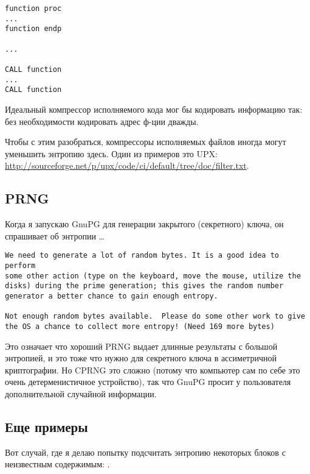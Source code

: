\begin{lstlisting}[style=customasmx86]
function proc
...
function endp

...

CALL function
...
CALL function
\end{lstlisting}

Идеальный компрессор исполняемого кода мог бы кодировать информацию так:
 без необходимости кодировать
адрес ф-ции  дважды.

Чтобы с этим разобраться, компрессоры исполняемых файлов иногда могут уменьшить энтропию здесь.
Один из примеров это UPX: \url{http://sourceforge.net/p/upx/code/ci/default/tree/doc/filter.txt}.

\subsection{\ac{PRNG}}

Когда я запускаю GnuPG для генерации закрытого (секретного) ключа, он спрашивает об энтропии \dots

\begin{lstlisting}
We need to generate a lot of random bytes. It is a good idea to perform
some other action (type on the keyboard, move the mouse, utilize the
disks) during the prime generation; this gives the random number
generator a better chance to gain enough entropy.

Not enough random bytes available.  Please do some other work to give
the OS a chance to collect more entropy! (Need 169 more bytes)
\end{lstlisting}

Это означает что хороший \ac{PRNG} выдает длинные результаты с большой энтропией,
и это тоже что нужно для секретного ключа в ассиметричной криптографии.
Но \ac{CPRNG} это сложно (потому что компьютер сам по себе это очень детерменистичное устройство),
так что GnuPG просит у пользователя дополнительной случайной информации.

\subsection{Еще примеры}

Вот случай, где я делаю попытку подсчитать энтропию некоторых блоков с неизвестным содержимым: .



